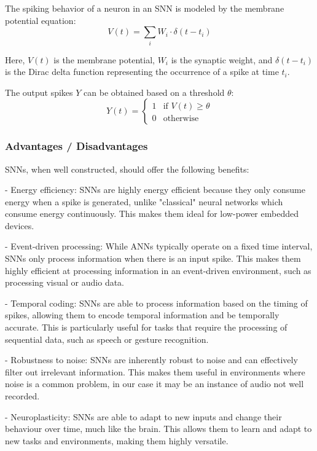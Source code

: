 \documentclass[11pt]{article}
\begin{document}
The spiking behavior of a neuron in an SNN is modeled by the membrane potential equation:
$$
  V(t) = \sum_{i} W_i \cdot \delta(t - t_i)
$$

Here, \(V(t)\) is the membrane potential, \(W_i\) is the synaptic weight, and \(\delta(t - t_i)\) is the Dirac delta function representing the occurrence of a spike at time \(t_i\).

The output spikes \(Y\) can be obtained based on a threshold \( \theta \):
$$
  Y(t) =
  \begin{cases}
    1 & \text{if } V(t) \geq \theta \\
    0 & \text{otherwise}
  \end{cases}
$$



\subsubsection{Advantages / Disadvantages}


SNNs, when well constructed, should offer the following benefits:

- Energy efficiency: SNNs are highly energy efficient because they only consume energy when a spike is generated, unlike "classical" neural networks which consume energy continuously. This makes them ideal for low-power embedded devices.

- Event-driven processing: While ANNs typically operate on a fixed time interval, SNNs only process information when there is an input spike. This makes them highly efficient at processing information in an event-driven environment, such as processing visual or audio data.

- Temporal coding: SNNs are able to process information based on the timing of spikes, allowing them to encode temporal information and be temporally accurate. This is particularly useful for tasks that require the processing of sequential data, such as speech or gesture recognition.

- Robustness to noise: SNNs are inherently robust to noise and can effectively filter out irrelevant information. This makes them useful in environments where noise is a common problem, in our case it may be an instance of audio not well recorded.

- Neuroplasticity: SNNs are able to adapt to new inputs and change their behaviour over time, much like the brain. This allows them to learn and adapt to new tasks and environments, making them highly versatile.
\end{document}
